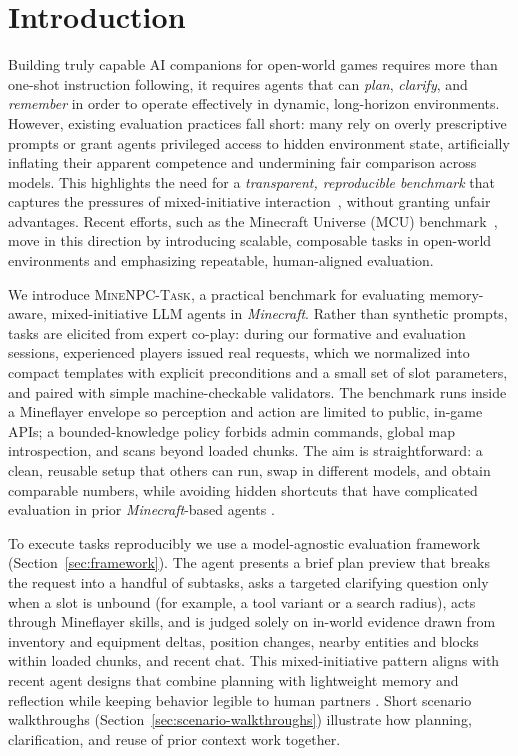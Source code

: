 \section{Introduction}

Building truly capable AI companions for open-world games requires more than one-shot instruction following, it requires agents that can \emph{plan}, \emph{clarify}, and \emph{remember} in order to operate effectively in dynamic, long-horizon environments. However, existing evaluation practices fall short: many rely on overly prescriptive prompts or grant agents privileged access to hidden environment state, artificially inflating their apparent competence and undermining fair comparison across models. This highlights the need for a \emph{transparent, reproducible benchmark} that captures the pressures of mixed-initiative interaction~\cite{Lai2022MixedInitiative}, without granting unfair advantages. Recent efforts, such as the Minecraft Universe (MCU) benchmark~\cite{MCU2023,MCU2023arxiv}, move in this direction by introducing scalable, composable tasks in open-world environments and emphasizing repeatable, human-aligned evaluation.


We introduce \textsc{MineNPC-Task}, a practical benchmark for evaluating memory-aware, mixed-initiative LLM agents in \emph{Minecraft}. Rather than synthetic prompts, tasks are elicited from expert co-play: during our formative and evaluation sessions, experienced players issued real requests, which we normalized into compact templates with explicit preconditions and a small set of slot parameters, and paired with simple machine-checkable validators. The benchmark runs inside a Mineflayer envelope so perception and action are limited to public, in-game APIs; a bounded-knowledge policy forbids admin commands, global map introspection, and scans beyond loaded chunks. The aim is straightforward: a clean, reusable setup that others can run, swap in different models, and obtain comparable numbers, while avoiding hidden shortcuts that have complicated evaluation in prior \emph{Minecraft}-based agents \citep{johnson2016the,fan2022minedojo,wang2023voyager}.

To execute tasks reproducibly we use a model-agnostic evaluation framework (Section~\ref{sec:framework}). The agent presents a brief plan preview that breaks the request into a handful of subtasks, asks a targeted clarifying question only when a slot is unbound (for example, a tool variant or a search radius), acts through Mineflayer skills, and is judged solely on in-world evidence drawn from inventory and equipment deltas, position changes, nearby entities and blocks within loaded chunks, and recent chat. This mixed-initiative pattern aligns with recent agent designs that combine planning with lightweight memory and reflection while keeping behavior legible to human partners \citep{10.1145/3586183.3606763, sarch2024vlm, Hou_2024}. Short scenario walkthroughs (Section~\ref{sec:scenario-walkthroughs}) illustrate how planning, clarification, and reuse of prior context work together.


